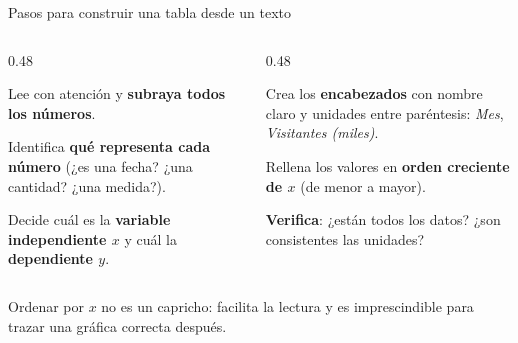 \documentclass[aspectratio=169, 10pt, spanish]{beamer}
\begin{document}
\begin{frame}{Pasos para construir una tabla desde un texto}
  \begin{columns}[T]
    \begin{column}{0.48\textwidth}
      \begin{pasobox}[1]
        \AlmFontSmall Lee con atención y \textbf{subraya todos los números}.
      \end{pasobox}

      \begin{pasobox}[2]
        \AlmFontSmall Identifica \textbf{qué representa cada número}
        (¿es una fecha? ¿una cantidad? ¿una medida?).
      \end{pasobox}

      \begin{pasobox}[3]
        \AlmFontSmall Decide cuál es la \textbf{variable independiente \(x\)}
        y cuál la \textbf{dependiente \(y\)}.
      \end{pasobox}
    \end{column}
    \begin{column}{0.48\textwidth}
      \begin{pasobox}[4]
        \AlmFontSmall Crea los \textbf{encabezados} con nombre claro y unidades
        entre paréntesis: \textit{Mes}, \textit{Visitantes (miles)}.
      \end{pasobox}

      \begin{pasobox}[5]
        \AlmFontSmall Rellena los valores en \textbf{orden creciente de \(x\)}
        (de menor a mayor).
      \end{pasobox}

      \begin{pasobox}[6]
        \AlmFontSmall \textbf{Verifica}: ¿están todos los datos?
        ¿son consistentes las unidades?
      \end{pasobox}
    \end{column}
  \end{columns}

  \vspace{0.2cm}
  \begin{notabox}[Clave]
    \AlmFontSmall
    Ordenar por \(x\) no es un capricho: facilita la lectura
    y es imprescindible para trazar una gráfica correcta después.
  \end{notabox}
\end{frame}
\end{document}
